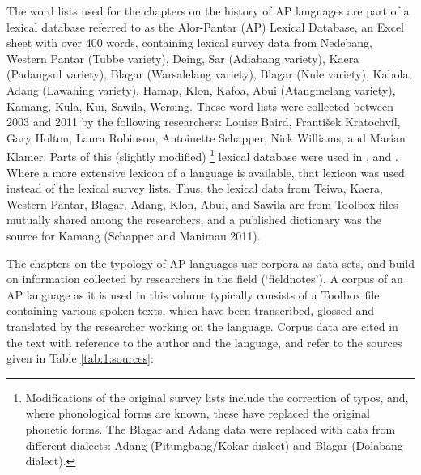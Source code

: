 {\clearpage 
The word lists used for the chapters on the history of AP languages are part of a lexical database referred to as the Alor-Pantar (AP) Lexical Database, an Excel sheet with over  400 words, containing lexical survey data from Nedebang, Western Pantar (Tubbe variety), Deing, Sar (Adiabang variety), Kaera (Padangsul variety), Blagar (Warsalelang variety), Blagar (Nule variety), Kabola, Adang (Lawahing variety), Hamap, Klon, Kafoa, Abui (Atangmelang variety), Kamang, Kula, Kui, Sawila, Wersing. These word lists were collected between 2003 and 2011 by the following researchers: Louise Baird, Franti\v{s}ek Kratochv\'il, Gary Holton, Laura Robinson, Antoinette Schapper, Nick Williams, and Marian Klamer. Parts of this (slightly modified){} \footnote{Modifications of the original survey lists include the correction of typos, and, where phonological forms are known, these have replaced the original phonetic forms. The Blagar and Adang data were replaced with data from different dialects: Adang (Pitungbang/Kokar dialect) and Blagar (Dolabang dialect).} lexical database were used in \citet{HoltonRobinsonTVa,HoltonRobinsonTVb}, and \citet{SchapperEtAlTV}. Where a more extensive lexicon of a language is available, that lexicon was used instead of the lexical survey lists. Thus, the lexical data from Teiwa, Kaera, Western Pantar, Blagar, Adang, Klon, Abui, and Sawila are from Toolbox files mutually shared among the researchers, and a published dictionary was the source for Kamang (Schapper and Manimau 2011).  

The chapters on the typology of AP languages use corpora as data sets, and build on information collected by researchers in the field (`fieldnotes'). A corpus of an AP language as it is used in this volume typically consists of a Toolbox file containing various spoken texts, which have been transcribed, glossed and translated by the researcher working on the language. Corpus data are cited in the text with reference to the author and the language, and refer to the  sources given in Table \ref{tab:1:sources}: 
 
}
